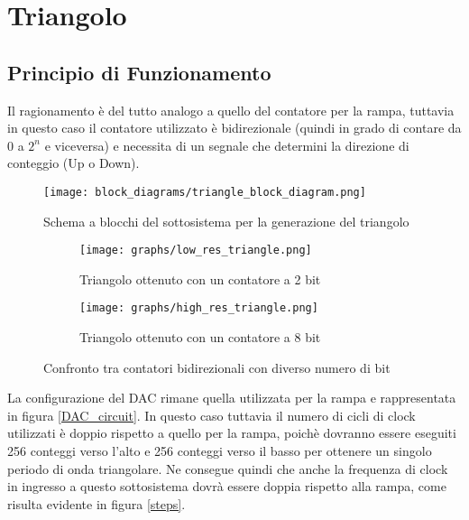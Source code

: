 
\section{Triangolo}


\subsection*{Principio di Funzionamento}


Il ragionamento è del tutto analogo a quello del contatore per la rampa, tuttavia in questo
caso il contatore utilizzato è bidirezionale (quindi in grado di contare da $0$ a $2^n$ e
viceversa) e necessita di un segnale che determini la direzione di conteggio (Up o Down).

\begin{figure}[H]
    \centering
    \texttt{[image: block\_diagrams/triangle\_block\_diagram.png]}
    \caption{Schema a blocchi del sottosistema per la generazione del triangolo}
    \label{triangle_block_diagram}
\end{figure}

\begin{figure}[H]
    \centering

    \begin{subfigure}{.5\textwidth}
        \centering
        \texttt{[image: graphs/low\_res\_triangle.png]}
        \caption{Triangolo ottenuto con un contatore a 2 bit}
        \label{low_res_triangle}
    \end{subfigure}%
    \begin{subfigure}{.5\textwidth}
        \centering
        \texttt{[image: graphs/high\_res\_triangle.png]}
        \caption{Triangolo ottenuto con un contatore a 8 bit}
        \label{high_res_triangle}
    \end{subfigure}

    \caption{Confronto tra contatori bidirezionali con diverso numero di bit}
    \label{triangles}
\end{figure}

La configurazione del DAC rimane quella utilizzata per la rampa e rappresentata in figura
\ref{DAC_circuit}. In questo caso tuttavia il numero di cicli di clock utilizzati è doppio
rispetto a quello per la rampa, poichè dovranno essere eseguiti 256 conteggi verso l'alto
e 256 conteggi verso il basso per ottenere un singolo periodo di onda triangolare. Ne
consegue quindi che anche la frequenza di clock in ingresso a questo sottosistema dovrà
essere doppia rispetto alla rampa, come risulta evidente in figura \ref{steps}.

